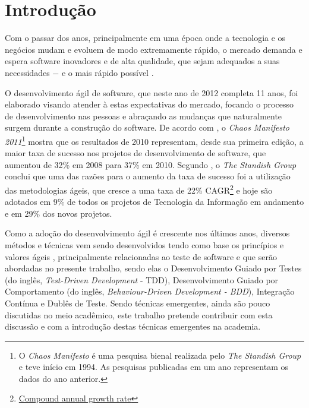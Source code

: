 \chapter{Introdução}

Com o passar dos anos, principalmente em uma época onde a tecnologia e os negócios mudam e evoluem de modo extremamente rápido, o mercado demanda e espera software inovadores e de alta qualidade, que sejam adequados a suas necessidades $-$ e o mais rápido possível \cite{TheBusinessOfInnovation}.

O desenvolvimento ágil de software, que neste ano de 2012 completa 11 anos, foi elaborado \cite{AgileManifesto} visando atender à estas expectativas do mercado, focando o processo de desenvolvimento nas pessoas e abraçando as mudanças que  naturalmente surgem durante a construção do software. De acordo com , o \textit{Chaos Manifesto 2011}\footnote{O \textit{Chaos Manifesto} é uma pesquisa bienal realizada pelo \textit{The Standish Group} e teve início em 1994. As pesquisas publicadas em um ano representam os dados do ano anterior.} mostra que os resultados de 2010 representam, desde sua primeira edição, a maior taxa de sucesso nos projetos de desenvolvimento de software, que aumentou de 32\% em 2008 para 37\% em 2010. Segundo , o \textit{The Standish Group} conclui que uma das razões para o aumento da taxa de sucesso foi a utilização das metodologias ágeis, que cresce a uma taxa de 22\% CAGR\footnote{\href{http://en.wikipedia.org/wiki/Compound_annual_growth_rate} {Compound annual growth rate}} e hoje são adotados em 9\% de todos os projetos de Tecnologia da Informação em andamento e em 29\% dos novos projetos.

Como a adoção do desenvolvimento ágil é crescente nos últimos anos, diversos métodos e técnicas vem sendo desenvolvidos tendo como base os princípios e valores ágeis \cite{BDDRodrigo}, principalmente relacionadas ao teste de software e que serão abordadas no presente trabalho, sendo elas o Desenvolvimento Guiado por Testes (do inglês, \textit{Test-Driven Development} - TDD), Desenvolvimento Guiado por Comportamento (do inglês, \textit{Behaviour-Driven Development - BDD}), Integração Contínua e Dublês de Teste. Sendo técnicas emergentes, ainda são pouco discutidas no meio acadêmico, este trabalho pretende contribuir com esta discussão e com a introdução destas técnicas emergentes na academia.


